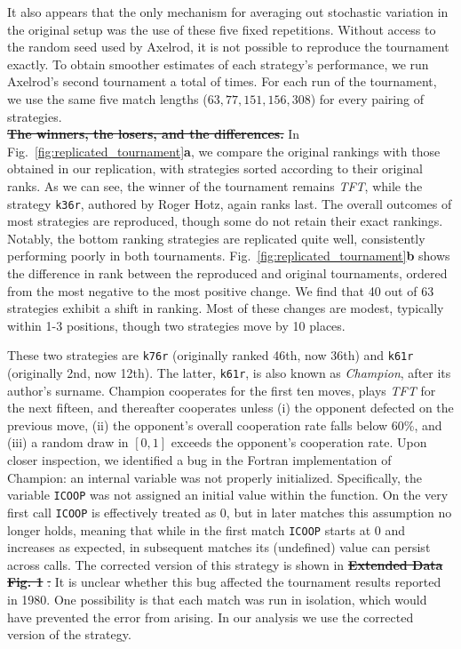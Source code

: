 \documentclass{article}
\newcommand{\TFT}{\emph{TFT}}
\providecommand{\DIFaddtex}[1]{{\protect\color{blue}\uwave{#1}}} %
\providecommand{\DIFdeltex}[1]{{\protect\color{red}\sout{#1}}}                      %
\providecommand{\DIFaddbegin}{} %
\providecommand{\DIFaddend}{} %
\providecommand{\DIFdelbegin}{} %
\providecommand{\DIFdelend}{} %
\providecommand{\DIFadd}[1]{\texorpdfstring{\DIFaddtex{#1}}{#1}} %
\providecommand{\DIFdel}[1]{\texorpdfstring{\DIFdeltex{#1}}{}} %
\newcommand{\DIFscaledelfig}{0.5}
\newlength{\DIFdelgraphicswidth} %
\newlength{\DIFdelgraphicsheight} %
\newcommand{\DIFaddincludegraphics}[2][]{{\color{blue}\fbox{\DIFOincludegraphics[#1]{#2}}}} %
\newcommand{\DIFdelincludegraphics}[2][]{%
\sbox{\DIFdelgraphicsbox}{\DIFOincludegraphics[#1]{#2}}%
\settoboxwidth{\DIFdelgraphicswidth}{\DIFdelgraphicsbox} %
\settoboxtotalheight{\DIFdelgraphicsheight}{\DIFdelgraphicsbox} %
\scalebox{\DIFscaledelfig}{%
\parbox[b]{\DIFdelgraphicswidth}{\usebox{\DIFdelgraphicsbox}\\[-\baselineskip] \rule{\DIFdelgraphicswidth}{0em}}\llap{\resizebox{\DIFdelgraphicswidth}{\DIFdelgraphicsheight}{%
\setlength{\unitlength}{\DIFdelgraphicswidth}%
\begin{picture}(1,1)%
\thicklines\linethickness{2pt} %
{\color[rgb]{1,0,0}\put(0,0){\framebox(1,1){}}}%
{\color[rgb]{1,0,0}\put(0,0){\line( 1,1){1}}}%
{\color[rgb]{1,0,0}\put(0,1){\line(1,-1){1}}}%
\end{picture}%
}\hspace*{3pt}}} %
} %
\DeclareRobustCommand{\DIFaddbegin}{\DIFOaddbegin \let\includegraphics\DIFaddincludegraphics} %
\DeclareRobustCommand{\DIFaddend}{\DIFOaddend \let\includegraphics\DIFOincludegraphics} %
\DeclareRobustCommand{\DIFdelbegin}{\DIFOdelbegin \let\includegraphics\DIFdelincludegraphics} %
\DeclareRobustCommand{\DIFdelend}{\DIFOaddend \let\includegraphics\DIFOincludegraphics} %
\begin{document}
It also appears that the only mechanism for averaging out stochastic variation in
the original setup was the use of these five fixed repetitions. Without access to
the random seed used by Axelrod, it is not possible to reproduce the tournament
exactly. To obtain smoother estimates of each strategy's performance, we run
Axelrod's second tournament a total of  times.
For each run of the tournament, we use the same five match lengths
(\(63, 77, 151, 156, 308\)) for every pairing of strategies. \\

\DIFdelbegin %
\textbf{\DIFdel{The winners, the losers, and the differences.}}
\DIFdelend In Fig.~\ref{fig:replicated_tournament}\textbf{a}, we compare the original rankings with
those obtained in our replication, with strategies sorted according to their
original ranks. As we can see, the winner of the tournament remains \TFT, while the strategy
\texttt{k36r}, authored by Roger Hotz, again ranks last.
The overall outcomes of
most strategies are reproduced, though some do not retain their exact rankings.
Notably, the bottom ranking strategies are replicated quite well, consistently
performing poorly in both tournaments. Fig.~\ref{fig:replicated_tournament}\textbf{b}
shows the difference in rank between the reproduced and original tournaments,
ordered from the most negative to the most positive change. We find that 40 out
of 63 strategies exhibit a shift in ranking. Most of these changes are modest,
typically within 1-3 positions, though two strategies move by 10 places.

These two strategies are \texttt{k76r} (originally ranked 46th, now 36th) and
\texttt{k61r} (originally 2nd, now 12th). The latter, \texttt{k61r}, is also
known as \emph{Champion}, after its author's surname. Champion cooperates for the
first ten moves, plays \TFT{} for the next fifteen, and thereafter cooperates
unless (i) the opponent defected on the previous move, (ii) the opponent's
overall cooperation rate falls below 60\%, and (iii) a random draw in $[0,1]$
exceeds the opponent's cooperation rate.
Upon closer inspection, we identified a bug in the Fortran implementation of
Champion: an internal variable was not properly initialized. Specifically, the
variable \texttt{ICOOP} was not assigned an initial value within the function. On the very
first call \texttt{ICOOP} is effectively treated as $0$, but in later matches this
assumption no longer holds, meaning that while in the first match \texttt{ICOOP}
starts at $0$ and increases as expected, in subsequent matches its (undefined)
value can persist across calls. The corrected version of this strategy is shown in
\DIFdelbegin \textbf{\DIFdel{Extended Data Fig. 1}}%
\DIFdel{. }\DIFdelend \DIFaddbegin \DIFadd{Supplementary Figure~1. }\DIFaddend It is unclear whether this bug affected the tournament
results reported in 1980. One possibility is that each match was run in isolation,
which would have prevented the error from arising. In our analysis we use the
corrected version of the strategy.
\end{document}
